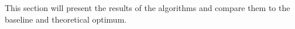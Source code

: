 This section will present the results of the algorithms and compare them to the baseline and theoretical optimum.
